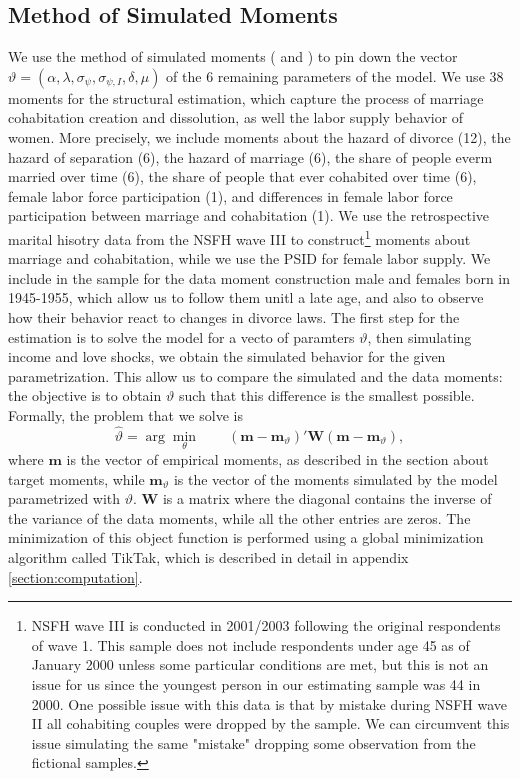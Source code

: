 \documentclass[12pt]{article}
\numberwithin{table}{section}
\begin{document}
\subsection{Method of Simulated Moments}
We use the method of simulated moments (\citealp{mcfadden1989} and \citealp{pakes1989}) to pin down the vector $\vartheta=(\alpha, \lambda, \sigma_\psi, \sigma_{\psi,I}, \delta, \mu)$ of the 6 remaining parameters of the model. We use 38 moments for the structural estimation, which capture the process of marriage cohabitation creation and dissolution, as well the labor supply behavior of women. More precisely, we include moments about the hazard of divorce (12), the hazard of separation (6), the hazard of marriage (6), the share of people everm married over time (6), the share of people that ever cohabited over time (6), female labor force participation (1), and differences in female labor force participation between marriage and cohabitation (1). We use the retrospective marital hisotry data from the NSFH wave III to construct\footnote{NSFH wave III is conducted in 2001/2003 following the original respondents of wave 1. This sample does not include respondents under age 45 as of January 2000 unless some particular conditions are met, but this is not an issue for us since the youngest person in our estimating sample was 44 in 2000. One possible issue with this data is that by mistake during NSFH wave II  all cohabiting couples were dropped by the sample. We can circumvent this issue simulating the same "mistake" dropping some observation from the fictional samples.} moments about marriage and cohabitation, while we use the PSID for female labor supply. We include in the sample for the data moment construction male and females born in 1945-1955, which allow us to follow them unitl a late age, and also to observe how their behavior react to changes in divorce laws. 
The first step for the estimation is to solve the model for a vecto of paramters $\vartheta$, then simulating income and love shocks, we obtain the simulated behavior for the given parametrization. This allow us to compare the simulated and the data moments: the objective is to obtain $\vartheta$ such that this difference is the smallest possible. Formally, the problem that we solve is
\begin{equation}
\hat{\vartheta}=\arg\min_\theta \quad\quad (\mathbf{m}-\mathbf{m}_\vartheta)'\mathbf{W}(\mathbf{m}-\mathbf{m}_\vartheta),
\end{equation}
where $\mathbf{m}$ is the vector of empirical moments, as described in the section about target moments, while $\mathbf{m}_\vartheta$ is the vector of the moments simulated by the model parametrized with $\vartheta$. $\mathbf{W}$ is a matrix where the diagonal contains the inverse of the variance of the data moments, while all the other entries are zeros.  The minimization of this object function is performed using a global minimization algorithm called TikTak, which is described in detail in appendix \ref{section:computation}.
\end{document}
